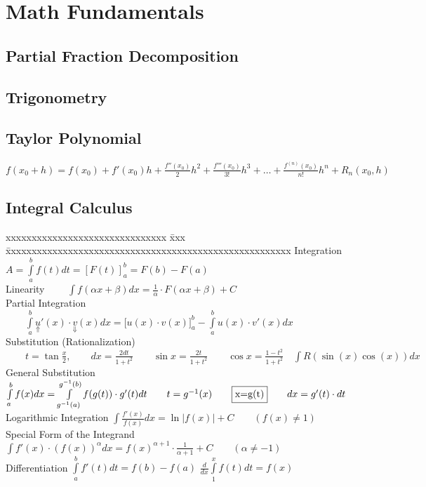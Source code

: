 \section{Math Fundamentals}

	\subsection{Partial Fraction Decomposition}
		

	\subsection{Trigonometry}
		

	\subsection{Taylor Polynomial}
		$f(x_0+h)=f(x_0) + f'(x_0)h + \frac{f''(x_0)}{2}h^2 + \frac{f'''(x_0)}{3!}h^3 + \ldots + \frac{f^{(n)}(x_0)}{n!}h^n + R_n(x_0, h)$

	\subsection{Integral Calculus}
	\begin{tabbing}
	     xxxxxxxxxxxxxxxxxxxxxxxxxxxxxxx \= xxx \= xxxxxxxxxxxxxxxxxxxxxxxxxxxxxxxxxxxxxxxxxxxxxxxxxxxxxxx\kill
	     Integration\>\>$A=\int\limits_{a}^{b}{f(t)dt}=\left[F(t)\right]_a^b=F(b)-F(a)$\\[0.2cm]
	     Linearity\>
	   $\qquad\int{f(\alpha x+\beta )dx=\frac{1}{\alpha}\cdot F(\alpha x+
				\beta)+C}$\\[0.2cm]
		   Partial Integration\>
	   $\qquad\int\limits_a^b{\underset{\Uparrow}{u}'(x)\cdot \underset{\Downarrow}{v}(x)dx}=\biggl[ u(x)\cdot v(x) \biggr]_a^b
	   -\int\limits_a^b{u(x)\cdot v'(x)dx}$\\[0.2cm]
	   Substitution (Rationalization)\>
	   $\qquad t=\tan\frac{x}{2}, \qquad dx=\frac{2dt}{1+t^2} \qquad
	   \sin  x=\frac{2t}{1+t^2} \qquad \cos x=\frac{1-t^2}{1+t^2}
				\quad\int{R(\sin(x)\cos(x))dx}$\\
	   General Substitution \> \>
				$\int\limits_{a}^{b}{f(x)dx}=\int\limits_{g^{-1}(a)}^{g^{-1}(b)}{f(g(t))\cdot
				g'(t)dt}\qquad t=g^{-1}(x)\qquad  \fbox{x=g(t)}\qquad dx=g'(t)\cdot dt$\\
	   Logarithmic Integration \>\>
	    $ \int{\frac{f'(x)}{f(x)}dx}=\ln|f(x)|+C	\qquad{(f(x)\neq 1)}$\\[0.2cm]
	  Special Form of the Integrand \>\>
		 		$\int{f'(x)\cdot (f(x))^{\alpha} dx}= f(x)^{\alpha +1}\cdot
		 		\frac{1}{\alpha+1}+C \qquad{(\alpha \neq -1)}$\\
	   Differentiation\>\>
		 		$\int \limits ^{b} _{a} {f'(t)dt}=f(b)-f(a)$\qquad
				$\frac{d}{dx} \int \limits ^{x} _{1} {f(t)dt}=f(x)$
	\end{tabbing}

